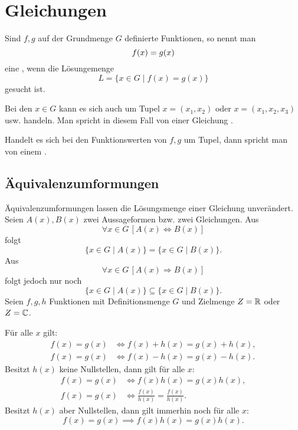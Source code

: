 \section{Gleichungen}
\begin{definition}[Bestimmungsgleichung]\mbox{}\newline
Sind $f,g$ auf der Grundmenge $G$ definierte Funktionen, so nennt
man
\begin{equation}
f(x) = g(x)\\
\end{equation}
eine ,
wenn die Lösungemenge
\begin{equation}
L = \{x\in G\mid f(x)=g(x)\}
\end{equation}
gesucht ist.
\end{definition}
Bei den $x\in G$ kann es sich auch um Tupel $x=(x_1,x_2)$ oder
$x=(x_1,x_2,x_3)$ usw. handeln. Man spricht in diesem Fall
von einer Gleichung .

Handelt es sich bei den Funktionswerten von $f,g$ um Tupel,
dann spricht man von einem
.

\subsection{Äquivalenzumformungen}

Äquivalenzumformungen lassen die Lösungsmenge einer Gleichung
unverändert. Seien $A(x),B(x)$ zwei Aussageformen bzw. zwei
Gleichungen. Aus
\begin{equation}
\forall x{\in}G\,[A(x)\Longleftrightarrow B(x)]
\end{equation}
folgt
\begin{equation}
\{x\in G\mid A(x)\} = \{x\in G\mid B(x)\}.
\end{equation}
Aus
\begin{equation}
\forall x{\in} G\,[A(x)\Longrightarrow B(x)]
\end{equation}
folgt jedoch nur noch
\begin{equation}
\{x\in G\mid A(x)\}\subseteq\{x\in G\mid B(x)\}.
\end{equation}
Seien $f,g,h$ Funktionen mit Definitionsmenge $G$ und
Zielmenge $Z=\mathbb R$ oder $Z=\mathbb C$.

Für alle $x$ gilt:
\begin{align}
f(x)=g(x) &\Longleftrightarrow f(x){+}h(x)=g(x){+}h(x),\\
f(x)=g(x) &\Longleftrightarrow f(x){-}h(x)=g(x){-}h(x).
\end{align}
Besitzt $h(x)$ keine Nullstellen, dann gilt für alle $x$:
\begin{align}
f(x)=g(x) &\iff f(x)h(x)=g(x)h(x),\\
f(x)=g(x) &\iff \frac{f(x)}{h(x)}=\frac{f(x)}{h(x)}.
\end{align}
Besitzt $h(x)$ aber Nullstellen, dann gilt immerhin noch für alle $x$:
\begin{equation}
f(x)=g(x) \implies f(x)h(x)=g(x)h(x).
\end{equation}

